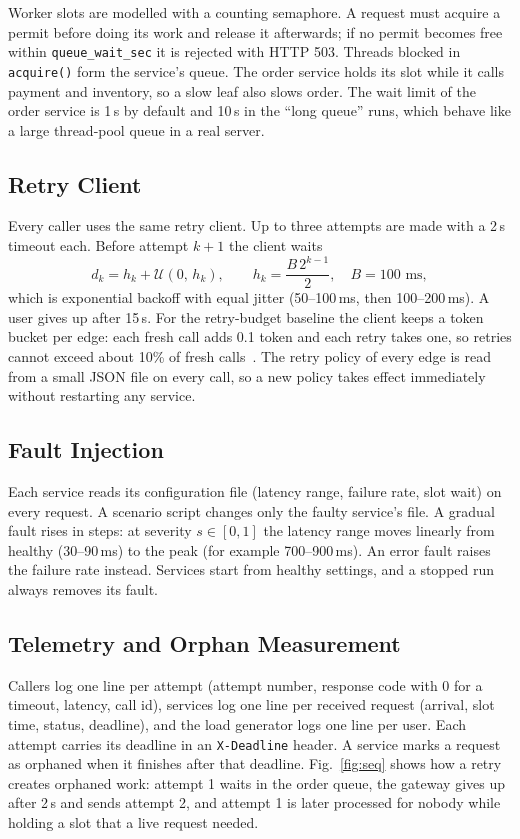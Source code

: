 \documentclass[conference,a4paper]{IEEEtran}
\begin{document}
Worker slots are modelled with a counting semaphore. A request must acquire a permit before doing its work and release it afterwards; if no permit becomes free within \texttt{queue\_wait\_sec} it is rejected with HTTP 503. Threads blocked in \texttt{acquire()} form the service's queue. The order service holds its slot while it calls payment and inventory, so a slow leaf also slows order. The wait limit of the order service is 1\,s by default and 10\,s in the ``long queue'' runs, which behave like a large thread-pool queue in a real server.

\subsection{Retry Client}
Every caller uses the same retry client. Up to three attempts are made with a 2\,s timeout each. Before attempt $k+1$ the client waits
\begin{equation}
d_k = h_k + \mathcal{U}(0,\, h_k), \qquad h_k = \frac{B\,2^{k-1}}{2}, \quad B = 100\text{ ms},
\label{eq:backoff}
\end{equation}
which is exponential backoff with equal jitter (50--100\,ms, then 100--200\,ms). A user gives up after 15\,s. For the retry-budget baseline the client keeps a token bucket per edge: each fresh call adds 0.1 token and each retry takes one, so retries cannot exceed about 10\% of fresh calls~\cite{brooker2019}. The retry policy of every edge is read from a small JSON file on every call, so a new policy takes effect immediately without restarting any service.

\subsection{Fault Injection}
Each service reads its configuration file (latency range, failure rate, slot wait) on every request. A scenario script changes only the faulty service's file. A gradual fault rises in steps: at severity $s \in [0,1]$ the latency range moves linearly from healthy (30--90\,ms) to the peak (for example 700--900\,ms). An error fault raises the failure rate instead. Services start from healthy settings, and a stopped run always removes its fault.

\subsection{Telemetry and Orphan Measurement}
Callers log one line per attempt (attempt number, response code with 0 for a timeout, latency, call id), services log one line per received request (arrival, slot time, status, deadline), and the load generator logs one line per user. Each attempt carries its deadline in an \texttt{X-Deadline} header. A service marks a request as orphaned when it finishes after that deadline. Fig.~\ref{fig:seq} shows how a retry creates orphaned work: attempt 1 waits in the order queue, the gateway gives up after 2\,s and sends attempt 2, and attempt 1 is later processed for nobody while holding a slot that a live request needed.
\end{document}

